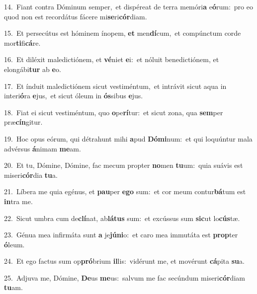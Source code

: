 {\numbfont\textcolor{\numbcolor}{14.}}~Fiant contra Dóminum semper,~\dagger et dispéreat de terra memóri\textbf{a} e\-\textbf{ó}\-rum:~\star pro eo quod non est recordátus fácere mi\-\textbf{se}\-ri\-\textbf{cór}\-diam.\par
{\numbfont\textcolor{\numbcolor}{15.}}~Et persecútus est hóminem ínopem, \textbf{et} men\-\textbf{dí}\-cum,~\star et compúnctum corde mor\-\textbf{ti}\-fi\-\textbf{cá}\-re.\par
{\numbfont\textcolor{\numbcolor}{16.}}~Et diléxit maledictiónem, et \textbf{vé}\-niet \textbf{e}\-i:~\star et nóluit benedictiónem, et elongábi\textbf{tur} ab \textbf{e}\-o.\par
{\numbfont\textcolor{\numbcolor}{17.}}~Et índuit maledictiónem sicut vestiméntum,~\dagger et intrávit sicut aqua in interi\-\textbf{ó}\-ra \textbf{e}\-jus,~\star et sicut óleum in \textbf{ós}\-sibus \textbf{e}\-jus.\par
{\numbfont\textcolor{\numbcolor}{18.}}~Fiat ei sicut vestiméntum, quo \textbf{o}\-pe\-\textbf{rí}\-tur:~\star et sicut zona, qua \textbf{sem}\-per præ\-\textbf{cín}\-gitur.\par
{\numbfont\textcolor{\numbcolor}{19.}}~Hoc opus eórum, qui détrahunt mihi \textbf{a}\-pud \textbf{Dó}\-\textbf{mi}num:~\star et qui loquúntur mala advérsus \textbf{á}\-nimam \textbf{me}\-am.\par
{\numbfont\textcolor{\numbcolor}{20.}}~Et tu, Dómine, Dómine, fac mecum propter \textbf{no}\-men \textbf{tu}\-um:~\star quia suávis est miseri\-\textbf{cór}\-dia \textbf{tu}\-a.\par
{\numbfont\textcolor{\numbcolor}{21.}}~Líbera me quia egénus, et \textbf{pau}\-per \textbf{e}\-\textbf{go} sum:~\star et cor meum contur\-\textbf{bá}\-tum est \textbf{in}\-tra me.\par
{\numbfont\textcolor{\numbcolor}{22.}}~Sicut umbra cum de\-\textbf{clí}\-nat, ab\-\textbf{lá}\-\textbf{tus} sum:~\star et excússus sum \textbf{sic}\-ut lo\-\textbf{cús}\-tæ.\par
{\numbfont\textcolor{\numbcolor}{23.}}~Génua mea infirmáta sunt \textbf{a} je\-\textbf{jú}\-\textbf{ni}o:~\star et caro mea immutáta est \textbf{prop}\-ter \textbf{ó}\-leum.\par
{\numbfont\textcolor{\numbcolor}{24.}}~Et ego factus sum op\-\textbf{pró}\-brium \textbf{il}\-lis:~\star vidérunt me, et movérunt \textbf{cá}\-pita \textbf{su}\-a.\par
{\numbfont\textcolor{\numbcolor}{25.}}~Adjuva me, Dómine, \textbf{De}\-us \textbf{me}\-us:~\star salvum me fac secúndum miseri\-\textbf{cór}\-diam \textbf{tu}\-am.\par
